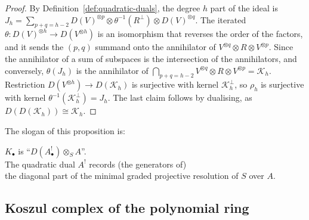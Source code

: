 \begin{supplementary}
\begin{proof}
By Definition~\ref{def:quadratic-duals}, the degree $h$ part of the ideal is $J_h=\sum_{p+q=h-2}D(V)^{\otimes p}\otimes\theta^{-1}(R^\perp)\otimes D(V)^{\otimes q}$.
The iterated $\theta:D(V)^{\otimes h}\to D(V^{\otimes h})$ is an isomorphism that reverses the order of the factors, and it sends the $(p,q)$ summand onto the annihilator of $V^{\otimes q}\otimes R\otimes V^{\otimes p}$.
Since the annihilator of a sum of subspaces is the intersection of the annihilators, and conversely, $\theta(J_h)$ is the annihilator of $\bigcap_{p+q=h-2}V^{\otimes q}\otimes R\otimes V^{\otimes p}=\mathcal K_h$.
Restriction $D(V^{\otimes h})\to D(\mathcal K_h)$ is surjective with kernel $\mathcal K_h^\perp$, so $\rho_h$ is surjective with kernel $\theta^{-1}(\mathcal K_h^\perp)=J_h$.
The last claim follows by dualising, as $D(D(\mathcal K_h))\cong\mathcal K_h$.
\end{proof}
\end{supplementary}

The slogan of this proposition is:
\begin{center}
$K_\bullet$ is ``$D(A_{\bullet}^!)\otimes_SA$''.\\
The quadratic dual $A^!$ records (the generators of)\\ the diagonal part of the minimal graded projective resolution of $S$ over $A$.
\end{center}

\subsection{Koszul complex of the polynomial ring}
\label{sec:koszul-complex-polynomial-ring}

